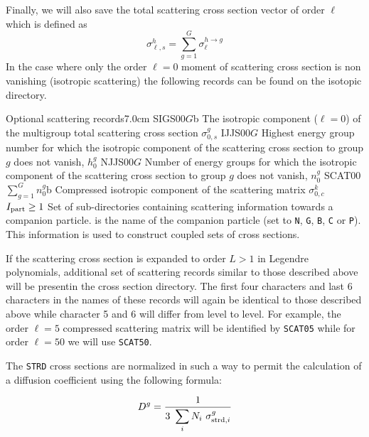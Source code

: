 Finally, we will also save the total scattering cross section vector of order
$\ell$ which is defined as 
  \begin{displaymath}
    \sigma_{\ell,s}^{h}=\sum_{g=1}^{G} \sigma_{\ell}^{h\to g}
  \end{displaymath}
In the case where only the order $\ell=0$ moment of scattering cross section is non
vanishing (isotropic scattering) the following records can be found on the
isotopic directory.

\begin{DescriptionEnregistrement}{Optional scattering records}{7.0cm}
\label{tabl:tabiso5}
\RealEnr
 {SIGS00}{$G$}{b}
 {The isotropic component ($\ell=0$) of the multigroup total scattering cross
  section
  $\sigma_{0,s}^{g}$}
\IntEnr
  {IJJS00}{$G$}
  {Highest energy group number for which 
   the isotropic component of the scattering cross section to group $g$ does not
   vanish, $h_{0}^{g}$}
\IntEnr
  {NJJS00}{$G$}
  {Number of energy groups for which 
   the isotropic component of the scattering cross section to group $g$ does not
   vanish, $n_{0}^{g}$}
\RealEnr
  {SCAT00}{$\sum_{g=1}^{G} n_{0}^{g}$}{b}
  {Compressed isotropic component of the scattering matrix
   $\sigma_{0,c}^{k}$}
\OptDirVar
  {}{$I_{\rm part}\ge 1$}
  {Set of sub-directories containing scattering information towards a companion particle. 
  is the name of the companion particle (set to {\tt N}, {\tt G}, {\tt B}, {\tt C} or {\tt P}). This information
  is used to construct coupled sets of cross sections.}
\end{DescriptionEnregistrement}

If the scattering cross section is
expanded to order $L>1$ in Legendre polynomials, additional set of scattering
records similar to those described above will be presentin the cross section directory.
The first four characters and last 6 characters in the names of
these records will again be identical to those described above while character 5
and 6 will differ from level to level. For example, the order
$\ell=5$ compressed scattering matrix will be identified by
\texttt{SCAT05} while for order 
$\ell=50$ we will use \texttt{SCAT50}.

\vskip 0.2cm

The {\tt STRD} cross sections are normalized in such a way to permit the
calculation of a diffusion coefficient using the following formula:

\begin{equation}
D^g={\displaystyle 1\over\displaystyle 3 \ \sum_i N_i \ \sigma_{{\rm strd},i}^g}
\end{equation}

